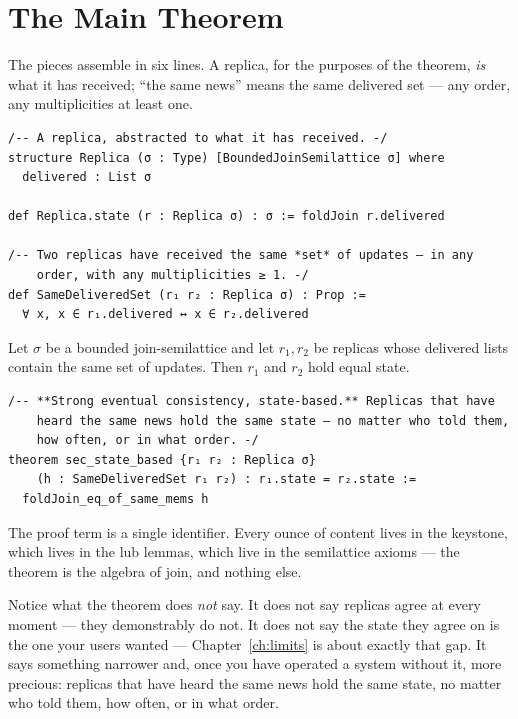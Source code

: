 \documentclass[12pt, a4paper, openright]{book}
\theoremstyle{thmstyle}
\theoremstyle{defstyle}
\newenvironment{thmbox}[1][]{%
  \begin{tcolorbox}[thmbox, title={\ifx\\#1\\Theorem\else#1\fi}]%
}{\end{tcolorbox}}
\begin{document}
\section{The Main Theorem}

The pieces assemble in six lines. A replica, for the purposes of the
theorem, \emph{is} what it has received; ``the same news'' means the same
delivered set --- any order, any multiplicities at least one.

\begin{verbatim}
/-- A replica, abstracted to what it has received. -/
structure Replica (σ : Type) [BoundedJoinSemilattice σ] where
  delivered : List σ

def Replica.state (r : Replica σ) : σ := foldJoin r.delivered

/-- Two replicas have received the same *set* of updates — in any
    order, with any multiplicities ≥ 1. -/
def SameDeliveredSet (r₁ r₂ : Replica σ) : Prop :=
  ∀ x, x ∈ r₁.delivered ↔ x ∈ r₂.delivered
\end{verbatim}

\begin{thmbox}[Strong eventual consistency, state-based]
  Let $\sigma$ be a bounded join-semilattice and let $r_1, r_2$ be
  replicas whose delivered lists contain the same set of updates. Then
  $r_1$ and $r_2$ hold equal state.
\end{thmbox}

\begin{verbatim}
/-- **Strong eventual consistency, state-based.** Replicas that have
    heard the same news hold the same state — no matter who told them,
    how often, or in what order. -/
theorem sec_state_based {r₁ r₂ : Replica σ}
    (h : SameDeliveredSet r₁ r₂) : r₁.state = r₂.state :=
  foldJoin_eq_of_same_mems h
\end{verbatim}

The proof term is a single identifier. Every ounce of content lives in
the keystone, which lives in the lub lemmas, which live in the
semilattice axioms --- the theorem is the algebra of join, and nothing
else.

Notice what the theorem does \emph{not} say. It does not say replicas
agree at every moment --- they demonstrably do not. It does not say the
state they agree on is the one your users wanted ---
Chapter~\ref{ch:limits} is about exactly that gap. It says something
narrower and, once you have operated a system without it, more precious:
replicas that have heard the same news hold the same state, no matter who
told them, how often, or in what order.
\end{document}
